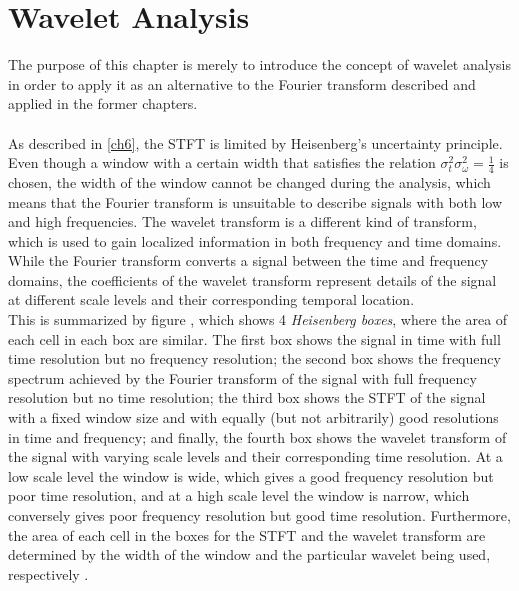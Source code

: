 \chapter{Wavelet Analysis}
The purpose of this chapter is merely to introduce the concept of wavelet analysis in order to apply it as an alternative to the Fourier transform described and applied in the former chapters.
\\ \\
As described in \ref{ch6}, the STFT is limited by Heisenberg's uncertainty principle. Even though a window with a certain width that satisfies the relation $\sigma_t^2 \sigma_\omega^2 = \frac{1}{4}$ is chosen, the width of the window cannot be changed during the analysis, which means that the Fourier transform is unsuitable to describe signals with both low and high frequencies. The wavelet transform is a different kind of transform, which is used to gain localized information in both frequency and time domains. While the Fourier transform converts a signal between the time and frequency domains, the coefficients of the wavelet transform represent details of the signal at different scale levels and their corresponding temporal location.
\\
This is summarized by figure , which shows 4 \textit{Heisenberg boxes}, where the area of each cell in each box are similar. The first box shows the signal in time with full time resolution but no frequency resolution; the second box shows the frequency spectrum achieved by the Fourier transform of the signal with full frequency resolution but no time resolution; the third box shows the STFT of the signal with a fixed window size and with equally (but not arbitrarily) good resolutions in time and frequency; and finally, the fourth box shows the wavelet transform of the signal with varying scale levels and their corresponding time resolution. At a low scale level the window is wide, which gives a good frequency resolution but poor time resolution, and at a high scale level the window is narrow, which conversely gives poor frequency resolution but good time resolution. Furthermore, the area of each cell in the boxes for the STFT and the wavelet transform are determined by the width of the window and the particular wavelet being used, respectively \cite{pages 409-410, Wang} \cite{page 43-44, wave_tut}.

